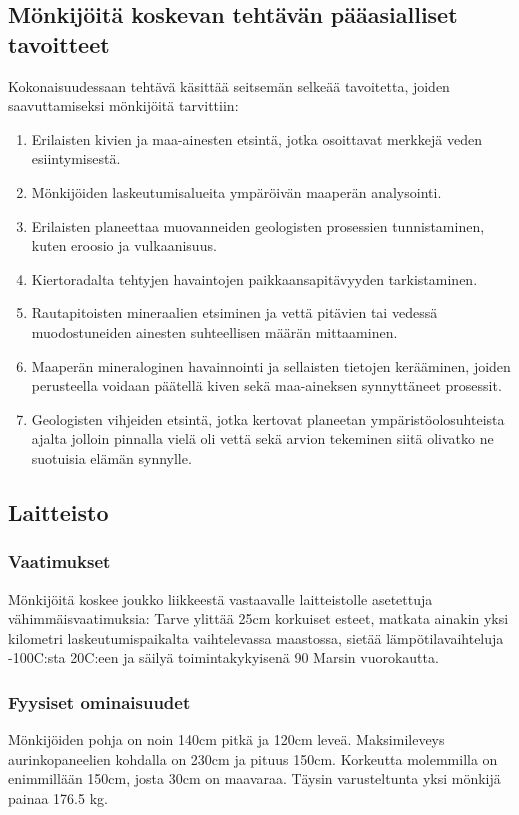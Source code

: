 \documentclass[finnish]{tktltiki2}
\theoremstyle{definition}
\theoremstyle{remark}
\begin{document}
\subsection{Mönkijöitä koskevan tehtävän pääasialliset tavoitteet}
Kokonaisuudessaan tehtävä käsittää seitsemän selkeää tavoitetta, joiden saavuttamiseksi mönkijöitä tarvittiin:
\begin{enumerate}
	\item Erilaisten kivien ja maa-ainesten etsintä, jotka osoittavat merkkejä veden esiintymisestä.
	\item Mönkijöiden laskeutumisalueita ympäröivän maaperän analysointi.
	\item Erilaisten planeettaa muovanneiden geologisten prosessien tunnistaminen, kuten eroosio ja vulkaanisuus.
	\item Kiertoradalta tehtyjen havaintojen paikkaansapitävyyden tarkistaminen.
	\item Rautapitoisten mineraalien etsiminen ja vettä pitävien tai vedessä muodostuneiden ainesten suhteellisen määrän mittaaminen.
	\item Maaperän mineraloginen havainnointi ja sellaisten tietojen kerääminen, joiden perusteella voidaan päätellä kiven sekä maa-aineksen synnyttäneet prosessit.
	\item Geologisten vihjeiden etsintä, jotka kertovat planeetan ympäristöolosuhteista ajalta jolloin pinnalla vielä oli vettä sekä arvion tekeminen siitä olivatko ne suotuisia elämän synnylle.
\end{enumerate}

\subsection{Laitteisto}

\subsubsection{Vaatimukset}
Mönkijöitä koskee joukko liikkeestä vastaavalle laitteistolle asetettuja vähimmäisvaatimuksia: Tarve ylittää 25cm korkuiset esteet, matkata ainakin yksi kilometri laskeutumispaikalta vaihtelevassa maastossa, sietää lämpötilavaihteluja -100C:sta 20C:een ja säilyä toimintakykyisenä 90 Marsin vuorokautta. \cite{lindemann2006mars}

\subsubsection{Fyysiset ominaisuudet}
Mönkijöiden pohja on noin 140cm pitkä ja 120cm leveä. Maksimileveys aurinkopaneelien kohdalla on 230cm ja pituus 150cm. Korkeutta molemmilla on enimmillään 150cm, josta 30cm on maavaraa. Täysin varusteltunta yksi mönkijä painaa 176.5 kg.
\end{document}
